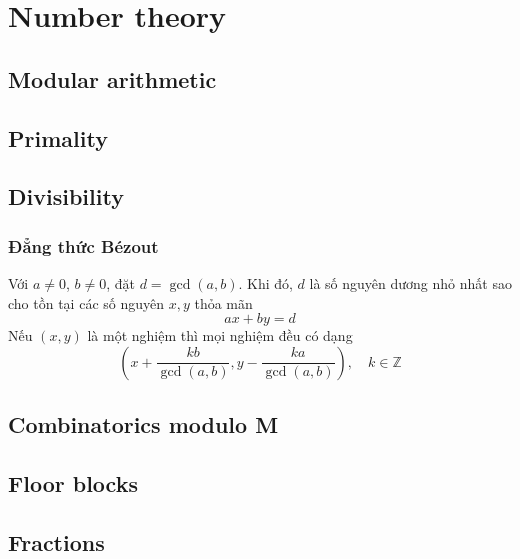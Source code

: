 \chapter{Number theory}

\section{Modular arithmetic}

\section{Primality}

\section{Divisibility}

	\subsection{Đẳng thức Bézout}
	Với $a \neq 0$, $b \neq 0$, đặt $d=\gcd(a,b)$.
	Khi đó, $d$ là số nguyên dương nhỏ nhất sao cho tồn tại các số nguyên
	$x,y$ thỏa mãn
	$$ax+by=d$$
	Nếu $(x,y)$ là một nghiệm thì mọi nghiệm đều có dạng
	$$\left(x+\frac{kb}{\gcd(a,b)}, y-\frac{ka}{\gcd(a,b)}\right),
	\quad k\in\mathbb{Z}$$


\section{Combinatorics modulo M}

\section{Floor blocks}

\section{Fractions}

